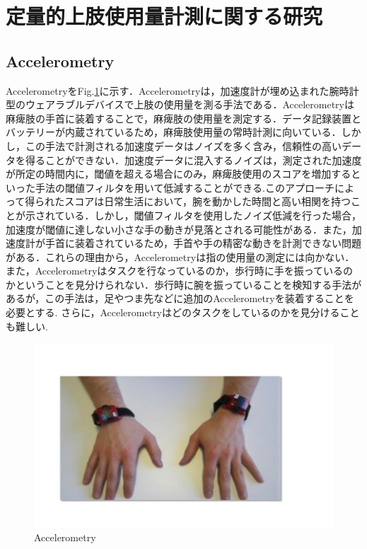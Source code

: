 \section{定量的上肢使用量計測に関する研究}
\subsection*{Accelerometry}
Accelerometry\cite{Chen2005,Hayward2016,Dwiputra2017,VanDerPas2011,VanDerLee2004,Thrane2011,Seitz2011}をFig.\ref{fig:Accelerometry}に示す．Accelerometryは，加速度計が埋め込まれた腕時計型のウェアラブルデバイスで上肢の使用量を測る手法である．Accelerometryは麻痺肢の手首に装着することで，麻痺肢の使用量を測定する．データ記録装置とバッテリーが内蔵されているため，麻痺肢使用量の常時計測に向いている\cite{VanDerPas2011}．しかし，この手法で計測される加速度データはノイズを多く含み，信頼性の高いデータを得ることができない．加速度データに混入するノイズは，測定された加速度が所定の時間内に，閾値を超える場合にのみ，麻痺肢使用のスコアを増加するといった手法の閾値フィルタを用いて低減することができる.このアプローチによって得られたスコアは日常生活において，腕を動かした時間と高い相関を持つことが示されている．しかし，閾値フィルタを使用したノイズ低減を行った場合，加速度が閾値に達しない小さな手の動きが見落とされる可能性がある．また，加速度計が手首に装着されているため，手首や手の精密な動きを計測できない問題がある．これらの理由から，Accelerometryは指の使用量の測定には向かない\cite{Uswatte2000}．
また，Accelerometryはタスクを行なっているのか，歩行時に手を振っているのかということを見分けられない．歩行時に腕を振っていることを検知する手法があるが，この手法は，足やつま先などに追加のAccelerometryを装着することを必要とする\cite{Ullery2015}.
さらに，Accelerometryはどのタスクをしているのかを見分けることも難しい\cite{Hayward2016}.
\begin{figure}[H]
  \centering
  \includegraphics[width=0.8\linewidth]{fig/ch1/acc}
  \caption{Accelerometry\cite{Chen2005}}
  \label{fig:Accelerometry}
\end{figure}

